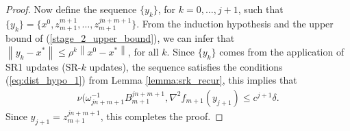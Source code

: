 \documentclass[letterpaper]{article} %
\theoremstyle{plain}
\theoremstyle{definition}
\theoremstyle{remark}
\newcommand\norm[1]{\left\lVert#1\right\rVert}
\begin{document}
\begin{proof}
    Now define the sequence $\{y_k\}$, for $k = 0, \dots, j + 1$, such that $\{y_k\} = \{x^0, z_{m+1}^{m+1}, \dots, z_{m+1}^{j n + m + 1} \}$. 
    From the induction hypothesis and the upper bound of (\ref{stage_2_upper_bound}), we can infer that $\norm{y_k - x^*} \leq \rho^k \norm{x^0 - x^*}$, for all $k$. 
    Since $\{y_k\}$ comes from the application of SR1 updates (SR-$k$ updates), the sequence satisfies the conditions (\ref{eq:dist_hypo_1}) from Lemma \ref{lemma:srk_recur}, this implies that
    \begin{align*}
           \nu(\omega_{j n + m + 1}^{-1} B_{m+1}^{j n + m + 1}, \nabla^2 f_{m+1}(y_{j+1}) \leq c^{j+1} \delta.
    \end{align*}
    Since $y_{j + 1} = z_{m+1}^{j n + m + 1}$, this completes the proof.
\end{proof}
\end{document}
